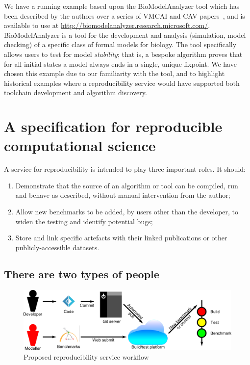 \documentclass[conference]{IEEEtran}
\begin{document}
We have a running example based upon the BioModelAnalyzer tool which
has been described by the authors over a series of VMCAI and CAV
papers~\cite{cook-et-al:2011,benque-et-al:2012,cook-et-al:2014}, 
and is available to use at
\url{http://biomodelanalyzer.research.microsoft.com/}.
BioModelAnalyzer is a tool for the development and analysis
(simulation, model checking) of a specific class of formal models for
biology. The tool specifically allows users to test for model
\emph{stability}; that is, a bespoke algorithm proves that for all
initial states a model always ends in a single, unique fixpoint. We have
chosen this example due to our familiarity with the tool, and to
highlight historical examples where a reproducibility service would
have supported both toolchain development and algorithm discovery.

\section{A specification for reproducible computational science}\label{spec}

A service for reproducibility is intended to play three important
roles. It should:

\begin{enumerate}
\item Demonstrate that the source of an algorithm or tool can be
  compiled, run and behave as described, without manual intervention
  from the author; 
\item Allow new benchmarks to be added, by users other than
the developer, to widen the testing and identify potential bugs; 
\item Store and link specific artefacts with their linked
publications or other publicly-accessible datasets. 
\end{enumerate}

\subsection{There are two types of people}

\begin{figure}[!htp]
	\centering
	\includegraphics[width=\textwidth]{workflow}
	\caption{Proposed reproducibility service workflow}
	\label{schematic}
\end{figure}
\end{document}
